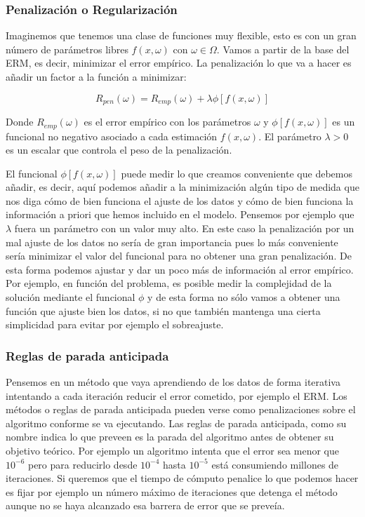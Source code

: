 \subsubsection{Penalización o Regularización}

Imaginemos que tenemos una clase de funciones muy flexible, esto es con un gran número de parámetros libres $f(x,\omega)$ con $\omega \in \Omega$. Vamos a partir de la base del ERM, es decir, minimizar el error empírico. La penalización lo que va a hacer es añadir un factor a la función a minimizar:

$$R_{pen}(\omega) = R_{emp}(\omega) + \lambda \phi [f(x,\omega)]$$

Donde $R_{emp}(\omega)$ es el error empírico con los parámetros $\omega$ y $\phi [f(x,\omega)]$ es un funcional no negativo asociado a cada estimación $f(x,\omega)$. El parámetro $\lambda >0$ es un escalar que controla el peso de la penalización.

El funcional $\phi [f(x,\omega)]$ puede medir lo que creamos conveniente que debemos añadir, es decir, aquí podemos añadir a la minimización algún tipo de medida que nos diga cómo de bien funciona el ajuste de los datos y cómo de bien funciona la información a priori que hemos incluido en el modelo. Pensemos por ejemplo que $\lambda$ fuera un parámetro con un valor muy alto. En este caso la penalización por un mal ajuste de los datos no sería de gran importancia pues lo más conveniente sería minimizar el valor del funcional para no obtener una gran penalización. De esta forma podemos ajustar y dar un poco más de información al error empírico. Por ejemplo, en función del problema, es posible medir la complejidad de la solución mediante el funcional $\phi$ y de esta forma no sólo vamos a obtener una función que ajuste bien los datos, si no que también mantenga una cierta simplicidad para evitar por ejemplo el sobreajuste.

\subsubsection{Reglas de parada anticipada}

Pensemos en un método que vaya aprendiendo de los datos de forma iterativa intentando a cada iteración reducir el error cometido, por ejemplo el ERM. Los métodos o reglas de parada anticipada pueden verse como penalizaciones sobre el algoritmo conforme se va ejecutando. Las reglas de parada anticipada, como su nombre indica lo que preveen es la parada del algoritmo antes de obtener su objetivo teórico. Por ejemplo un algoritmo intenta que el error sea menor que $10^{-6}$ pero para reducirlo desde $10^{-4}$ hasta $10^{-5}$ está consumiendo millones de iteraciones. Si queremos que el tiempo de cómputo penalice lo que podemos hacer es fijar por ejemplo un número máximo de iteraciones que detenga el método aunque no se haya alcanzado esa barrera de error que se preveía.

